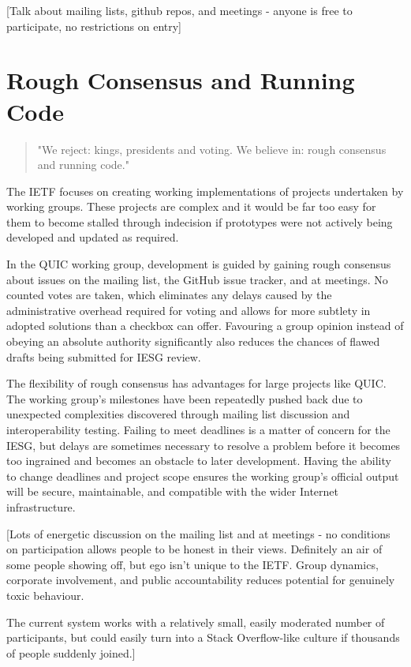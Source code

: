 \documentclass{l4proj}
\begin{document}
[Talk about mailing lists, github repos, and meetings - anyone is free to participate, no restrictions on entry]

\section{Rough Consensus and Running Code}
\begin{quotation}
"We reject: kings, presidents and voting. We believe in: rough consensus and running code."
\end{quotation}

The IETF focuses on creating working implementations of projects undertaken by working groups. These projects are complex and it would be far too easy for them to become stalled through indecision if prototypes were not actively being developed and updated as required.

In the QUIC working group, development is guided by gaining rough consensus about issues on the mailing list, the GitHub issue tracker, and at meetings. No counted votes are taken, which eliminates any delays caused by the administrative overhead required for voting and allows for more subtlety in adopted solutions than a checkbox can offer. Favouring a group opinion instead of obeying an absolute authority significantly also reduces the chances of flawed drafts being submitted for IESG review.

The flexibility of rough consensus has advantages for large projects like QUIC. The working group's milestones have been repeatedly pushed back due to unexpected complexities discovered through mailing list discussion and interoperability testing. Failing to meet deadlines is a matter of concern for the IESG, but delays are sometimes necessary to resolve a problem before it becomes too ingrained and becomes an obstacle to later development. Having the ability to change deadlines and project scope ensures the working group's official output will be secure, maintainable, and compatible with the wider Internet infrastructure.

[Lots of energetic discussion on the mailing list and at meetings - no conditions on participation allows people to be honest in their views. Definitely an air of some people showing off, but ego isn't unique to the IETF. Group dynamics, corporate involvement, and public accountability reduces potential for genuinely toxic behaviour.

The current system works with a relatively small, easily moderated number of participants, but could easily turn into a Stack Overflow-like culture if thousands of people suddenly joined.]
\end{document}
